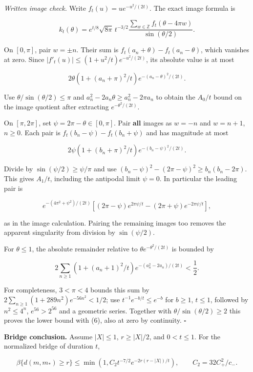 \documentclass[11pt,a4paper]{article}
\begin{document}
\emph{Written image check.} Write \(f_t(u)=u e^{-u^2/(2t)}\). The exact
image formula is

\[k_t(\theta)=e^{t/8}\sqrt{8\pi}\,t^{-3/2}
\frac{\sum_{w\in\mathbb Z}f_t(\theta-4\pi w)}{\sin(\theta/2)}.\]

On \([0,\pi]\), pair \(w=\pm n\). Their sum is
\(f_t(a_n+\theta)-f_t(a_n-\theta)\), which vanishes at zero. Since
\(|f'_t(u)|\le(1+u^2/t)e^{-u^2/(2t)}\), its absolute value is at most

\[2\theta(1+(a_n+\pi)^2/t)e^{-(a_n-\theta)^2/(2t)}.\]

Use \(\theta/\sin(\theta/2)\le\pi\) and
\(a_n^2-2a_n\theta\ge a_n^2-2\pi a_n\) to obtain the \(A_0/t\) bound on
the image quotient after extracting \(e^{-\theta^2/(2t)}\).

On \([\pi,2\pi]\), set \(\psi=2\pi-\theta\in[0,\pi]\). Pair \textbf{all}
images as \(w=-n\) and \(w=n+1\), \(n\ge0\). Each pair is
\(f_t(b_n-\psi)-f_t(b_n+\psi)\) and has magnitude at most

\[2\psi(1+(b_n+\pi)^2/t)e^{-(b_n-\psi)^2/(2t)}.\]

Divide by \(\sin(\psi/2)\ge\psi/\pi\) and use
\((b_n-\psi)^2-(2\pi-\psi)^2\ge b_n(b_n-2\pi)\). This gives \(A_1/t\),
including the antipodal limit \(\psi=0\). In particular the leading pair
is

\[e^{-(4\pi^2+\psi^2)/(2t)}
[(2\pi-\psi)e^{2\pi\psi/t}-(2\pi+\psi)e^{-2\pi\psi/t}],\]

as in the image calculation. Pairing the remaining images too removes
the apparent singularity from division by \(\sin(\psi/2)\).

For \(\theta\le1\), the absolute remainder relative to
\(\theta e^{-\theta^2/(2t)}\) is bounded by

\[2\sum_{n\ge1}(1+(a_n+1)^2/t)e^{-(a_n^2-2a_n)/(2t)}<\frac12.\]

For completeness, \(3<\pi<4\) bounds this sum by
\(2\sum_{n\ge1}(1+289n^2)e^{-56n^2}<1/2\); use
\(t^{-1}e^{-b/t}\le e^{-b}\) for \(b\ge1\), \(t\le1\), followed by
\(n^2\le4^n\), \(e^{56}>2^{56}\) and a geometric series. Together with
\(\theta/\sin(\theta/2)\ge2\) this proves the lower bound with (6), also
at zero by continuity. \(\square\)

\textbf{Bridge conclusion.} Assume \(|X|\le1\), \(r\ge|X|/2\), and
\(0<t\le1\). For the normalized bridge of duration \(t\),

\[\beta\{d(m,m_*)\ge r\}
\le \min\left(1,C_2t^{-7/2}e^{-2r(r-|X|)/t}\right),
\qquad C_2=32C_+^2/c_-.\tag{7}\]
\end{document}
